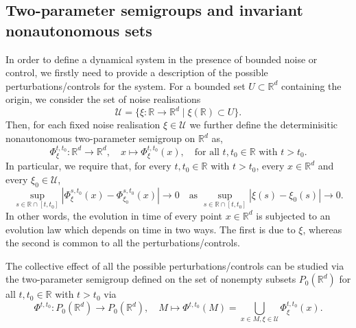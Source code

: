 \documentclass[reqno]{amsart}
\theoremstyle{definition}
\numberwithin{equation}{section}
\newcommand{\R}{\mathbb{R}}
\newcommand{\U}{\mathcal{U}}
\begin{document}
\subsection{Two-parameter semigroups and invariant nonautonomous sets}\label{subsec:nonautonomous}
In order to define a dynamical system in the presence of bounded noise or control, we firstly need to provide a description of the possible perturbations/controls for the system. For a bounded set $U\subset \R^d$ containing the origin, we consider the set of noise realisations 
\[
\U=\{\xi:\mathbb{R}\to \R^d\mid \xi(\mathbb{R})\subset U\}.
\]
Then, for each fixed noise realisation $\xi\in\U$ we further define the determinisitic nonautonomous two-parameter semigroup on $\R^d$ as,
\[
\Phi^{t,t_0}_\xi:\R^d\to \R^d,\quad x\mapsto\Phi^{t,t_0}_\xi(x),\quad \text{for all } t,t_0\in\mathbb{R} \text{ with } t>t_0.
\]
In particular, we require that, for every $t,t_0\in\mathbb{R}$ with $t>t_0$, every $x\in\R^d$ and every $\xi_0\in\U$,
\[
\sup_{s\in\mathbb{R}\cap[t,t_0]}|\Phi^{s,t_0}_\xi(x)-\Phi^{s,t_0}_{\xi_0}(x)|\to0\quad \text{as }  \sup_{s\in\mathbb{R}\cap[t,t_0]}|\xi(s)-\xi_0(s)|\to0.
\]
In other words, the evolution in time of every point $x\in\R^d$ is subjected to an evolution law which depends on time in two ways. The first is due to $\xi$, whereas the second is common to all the perturbations/controls. \smallskip


The collective effect of all the possible perturbations/controls can be studied via the two-parameter semigroup defined on the set of nonempty subsets  $P_0(\R^d)$ for all $t,t_0\in\mathbb{R} $ with $t>t_0$ via
\[
\Phi^{t,t_0}:P_0(\R^d)\to P_0(\R^d),\quad M\mapsto\Phi^{t,t_0}(M)=\bigcup_{x\in M, \xi\in\U}\Phi^{t,t_0}_\xi(x).
\]
\end{document}
